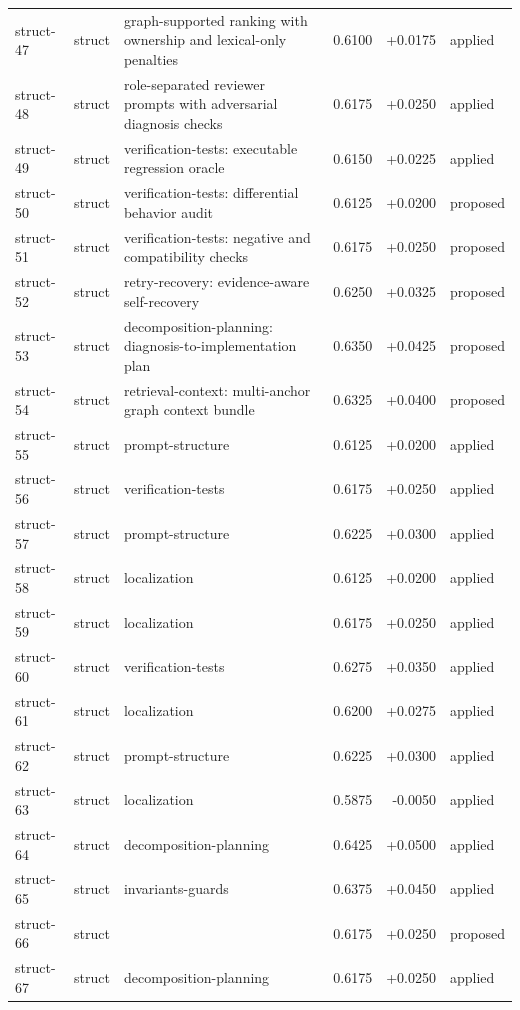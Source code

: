 \begin{center}
\begin{longtable}{llp{5.2cm}rrl}
struct-47 & struct & graph-supported ranking with ownership and lexical-only penalties & 0.6100 & +0.0175 & applied \\
struct-48 & struct & role-separated reviewer prompts with adversarial diagnosis checks & 0.6175 & +0.0250 & applied \\
struct-49 & struct & verification-tests: executable regression oracle & 0.6150 & +0.0225 & applied \\
struct-50 & struct & verification-tests: differential behavior audit & 0.6125 & +0.0200 & proposed \\
struct-51 & struct & verification-tests: negative and compatibility checks & 0.6175 & +0.0250 & proposed \\
struct-52 & struct & retry-recovery: evidence-aware self-recovery & 0.6250 & +0.0325 & proposed \\
struct-53 & struct & decomposition-planning: diagnosis-to-implementation plan & 0.6350 & +0.0425 & proposed \\
struct-54 & struct & retrieval-context: multi-anchor graph context bundle & 0.6325 & +0.0400 & proposed \\
struct-55 & struct & prompt-structure & 0.6125 & +0.0200 & applied \\
struct-56 & struct & verification-tests & 0.6175 & +0.0250 & applied \\
struct-57 & struct & prompt-structure & 0.6225 & +0.0300 & applied \\
struct-58 & struct & localization & 0.6125 & +0.0200 & applied \\
struct-59 & struct & localization & 0.6175 & +0.0250 & applied \\
struct-60 & struct & verification-tests & 0.6275 & +0.0350 & applied \\
struct-61 & struct & localization & 0.6200 & +0.0275 & applied \\
struct-62 & struct & prompt-structure & 0.6225 & +0.0300 & applied \\
struct-63 & struct & localization & 0.5875 & -0.0050 & applied \\
struct-64 & struct & decomposition-planning & 0.6425 & +0.0500 & applied \\
struct-65 & struct & invariants-guards & 0.6375 & +0.0450 & applied \\
struct-66 & struct &  & 0.6175 & +0.0250 & proposed \\
struct-67 & struct & decomposition-planning & 0.6175 & +0.0250 & applied \\

\end{longtable}
\end{center}
